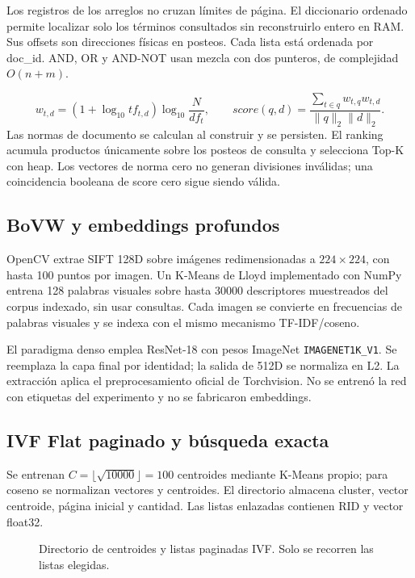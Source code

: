 \documentclass[11pt,a4paper]{article}
\newcommand{\code}[1]{\texttt{#1}}
\begin{document}
Los registros de los arreglos no cruzan límites de página. El diccionario ordenado permite localizar solo los términos consultados sin reconstruirlo entero en RAM. Sus offsets son direcciones físicas en posteos. Cada lista está ordenada por doc\_id. AND, OR y AND-NOT usan mezcla con dos punteros, de complejidad $O(n+m)$.

\[
w_{t,d}=(1+\log_{10}tf_{t,d})\log_{10}\frac{N}{df_t},\qquad
score(q,d)=\frac{\sum_{t\in q} w_{t,q}w_{t,d}}{\lVert q\rVert_2\lVert d\rVert_2}.
\]
Las normas de documento se calculan al construir y se persisten. El ranking acumula productos únicamente sobre los posteos de consulta y selecciona Top-K con heap. Los vectores de norma cero no generan divisiones inválidas; una coincidencia booleana de score cero sigue siendo válida.

\subsection{BoVW y embeddings profundos}
OpenCV extrae SIFT 128D sobre imágenes redimensionadas a $224\times224$, con hasta 100 puntos por imagen. Un K-Means de Lloyd implementado con NumPy entrena 128 palabras visuales sobre hasta 30000 descriptores muestreados del corpus indexado, sin usar consultas. Cada imagen se convierte en frecuencias de palabras visuales y se indexa con el mismo mecanismo TF-IDF/coseno.

El paradigma denso emplea ResNet-18 con pesos ImageNet \code{IMAGENET1K\_V1}. Se reemplaza la capa final por identidad; la salida de 512D se normaliza en L2. La extracción aplica el preprocesamiento oficial de Torchvision. No se entrenó la red con etiquetas del experimento y no se fabricaron embeddings.

\subsection{IVF Flat paginado y búsqueda exacta}
Se entrenan $C=\lfloor\sqrt{10000}\rfloor=100$ centroides mediante K-Means propio; para coseno se normalizan vectores y centroides. El directorio almacena cluster, vector centroide, página inicial y cantidad. Las listas enlazadas contienen RID y vector float32.

\begin{figure}[H]\centering
{}
\caption{Directorio de centroides y listas paginadas IVF. Solo se recorren las listas elegidas.}\label{fig:ivf}
\end{figure}
\end{document}
